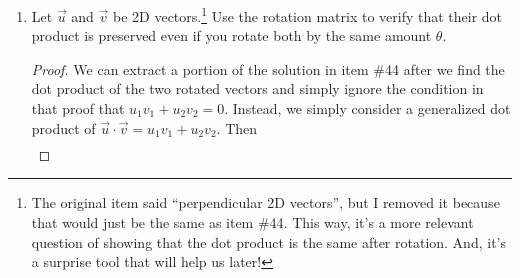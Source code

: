 \documentclass{article}
\begin{document}
\begin{enumerate}
\begin{proof}
\begin{align}
        \end{align} Finding the dot product of~\eqref{u_rot} and~\eqref{v_rot} (I'm doing this in two lines because they won't fit in one),\begin{align}
            (u_1 \cos\theta - u_2\sin\theta)\,(v_1 \cos\theta - v_2\sin\theta) &= u_1 v_1 \cos^2\theta + u_2 v_2 \sin^2\theta - u_1 v_2\sin\theta\cos\theta - u_2 v_1 \sin\theta\cos\theta \notag \\ 
            &= u_1 v_1 \cos^2\theta + u_2 v_2 \sin^2\theta - \sin\theta\cos\theta \, (u_1 v_2 + u_2 v_1 ) \label{1_dot} \\ 
            (u_1 \sin\theta + u_2\cos\theta)\,(v_1 \sin\theta + v_2\cos\theta) &= u_1 v_1 \sin^2\theta + u_2 v_2 \cos^2\theta + u_1 v_2\sin\theta\cos\theta + u_2 v_1 \sin\theta\cos\theta \notag \\ 
            &= u_1 v_1 \sin^2\theta + u_2 v_2 \cos^2\theta + \sin\theta\cos\theta \, (u_1 v_2 + u_2 v_1 ) \label{2_dot}. 
        \end{align}Adding~\eqref{1_dot} and~\eqref{2_dot} together to complete the dot product,\begin{align*}
            &= \sin^2\theta \, (u_1 v_1 + u_2 v_2) + \cos^2\theta \, (u_1 v_1 + u_2 v_2) - \sin\theta\cos\theta \, (u_1 v_2 + u_2 v_1 ) + \sin\theta\cos\theta \, (u_1 v_2 + u_2 v_1 ) \\ 
            &= \sin^2\theta \, (0) + \cos^2\theta \, (0) = 0. 
        \end{align*} Thus, the dot product of the two rotated vectors is 0, which means they are perpendicular. 
    \end{proof}
    \item Let \(\overrightarrow{u}\) and \(\overrightarrow{v}\) be 2D vectors.\footnote{The original item said ``perpendicular 2D vectors'', but I removed it because that would just be the same as item \#44. This way, it's a more 
    relevant question of showing that the dot product is the same after rotation. And, it's a surprise tool that will help us later!} Use the rotation matrix to verify that their dot product is preserved even if you rotate both 
    by the same amount \(\theta\).\begin{proof}
        We can extract a portion of the solution in item \#44 after we find the dot product of the two rotated vectors and simply ignore the condition in that proof that \(u_1 v_1 + u_2 v_2 = 0\). Instead, we simply consider a generalized dot product of \(\overrightarrow{u} \cdot \overrightarrow{v} = u_1 v_1 + u_2 v_2\). Then\begin{align*} 

\end{align*}
\end{proof}
\end{enumerate}
\end{document}
